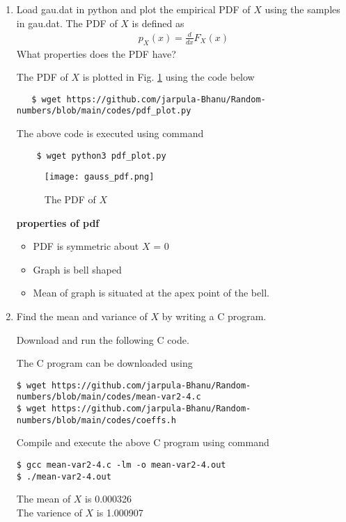 \documentclass[journal,12pt,twocolumn]{IEEEtran}
\renewcommand\thesection{\arabic{section}}
\begin{document}
\begin{enumerate}[label=\thesection.\arabic*
,ref=\thesection.\theenumi]
\item
Load gau.dat in python and plot the empirical PDF of $X$ using the samples in gau.dat. The PDF of $X$ is defined as
\begin{align}
p_{X}(x) = \frac{d}{dx}F_{X}(x)
\end{align}
What properties does the PDF have?

\solution The PDF of $X$ is plotted in Fig. \ref{fig:gauss_pdf}
using the code below 
\begin{lstlisting}
   $ wget https://github.com/jarpula-Bhanu/Random-numbers/blob/main/codes/pdf_plot.py
\end{lstlisting}
The above code is executed using command
\begin{lstlisting}
    $ wget python3 pdf_plot.py 
\end{lstlisting}
\begin{figure}[h]
    \centering
    \texttt{[image: gauss\_pdf.png]}
    \caption{The PDF of $X$}
    \label{fig:gauss_pdf}
\end{figure}

\textbf{properties of pdf}
\begin{itemize}
    \item PDF is symmetric about $X$ = 0 
    \item Graph is bell shaped
    \item Mean of graph is situated at the apex point of the bell.\\
\end{itemize}

\item Find the mean and variance of $X$ by writing a C program.

\solution
Download and run the following C code.

\noindent The C program can be downloaded using
\begin{lstlisting}
$ wget https://github.com/jarpula-Bhanu/Random-numbers/blob/main/codes/mean-var2-4.c
$ wget https://github.com/jarpula-Bhanu/Random-numbers/blob/main/codes/coeffs.h
\end{lstlisting}
Compile and execute the above C program using command
\begin{lstlisting}
$ gcc mean-var2-4.c -lm -o mean-var2-4.out
$ ./mean-var2-4.out
\end{lstlisting}

The mean of $X$ is 0.000326\\
The varience of $X$ is 1.000907\\


\end{enumerate}
\end{document}
